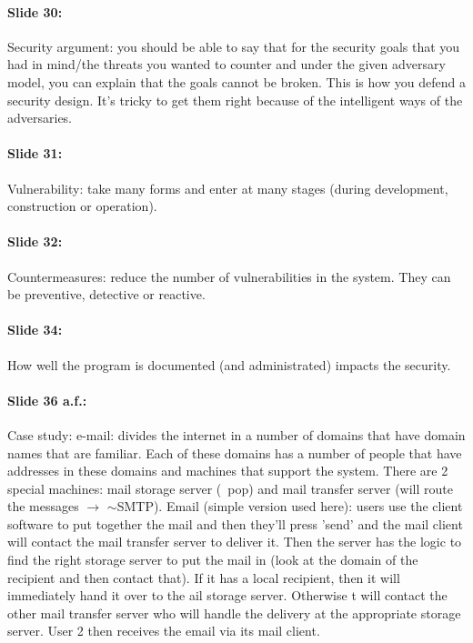 \documentclass[10pt,a4paper]{report}
\begin{document}
\paragraph{Slide 30:} Security argument: you should be able to say that for the security goals that you had in mind/the threats you wanted to counter and under the given adversary model, you can explain that the goals cannot be broken. This is how you defend a security design. It's tricky to get them right because of the intelligent ways of the adversaries.

\paragraph{Slide 31:} Vulnerability: take many forms and enter at many stages (during development, construction or operation).

\paragraph{Slide 32:} Countermeasures: reduce the number of vulnerabilities in the system. They can be preventive, detective or reactive.

\paragraph{Slide 34:} How well the program is documented (and administrated) impacts the security.

\paragraph{Slide 36 a.f.:} Case study: e-mail: divides the internet in a number of domains that have domain names that are familiar. Each of these domains has a number of people that have addresses in these domains and machines that support the system. There are 2 special machines: mail storage server (~pop) and mail transfer server (will route the messages $\rightarrow$ $\sim$SMTP). Email (simple version used here): users use the client software to put together the mail and then they'll press 'send' and the mail client will contact the mail transfer server to deliver it. Then the server has the logic to find the right storage server to put the mail in (look at the domain of the recipient and then contact that). If it has a local recipient, then it will immediately hand it over to the ail storage server. Otherwise t will contact the other mail transfer server who will handle the delivery at the appropriate storage server. User 2 then receives the email via its mail client.\\
\end{document}
